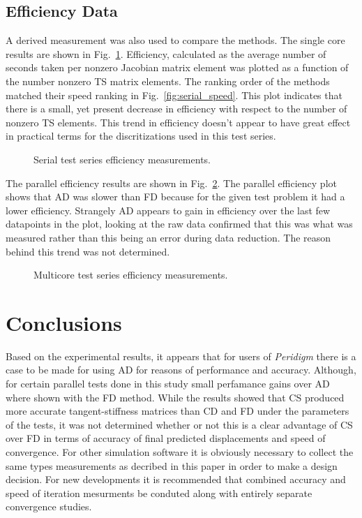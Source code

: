 \documentclass[preprint,12pt]{elsarticle}
\begin{document}
\subsection{Efficiency Data}
A derived measurement was also used to compare the methods. The single core results are shown in Fig.~\ref{fig:serial_efficiency}. Efficiency, calculated as the average number of seconds taken per nonzero Jacobian matrix element was plotted as a function of the number nonzero TS matrix elements. The ranking order of the methods
matched their speed ranking in Fig.~\ref{fig:serial_speed}. This plot indicates that there is a small, yet present decrease in efficiency with respect to the number of nonzero TS elements. This trend in efficiency doesn't appear to have great effect in practical terms for the discritizations used in this test series.  
%
\begin{figure}[tbp]
  \centering
  \scalebox{1.0}{}
  \caption{Serial test series efficiency measurements.}
  \label{fig:serial_efficiency}
\end{figure}
%
The parallel efficiency results are shown in Fig.~\ref{fig:multi_efficiency}. The parallel efficiency plot shows that AD was slower than FD because for the given test problem it had a lower efficiency. Strangely AD appears to gain in efficiency over the last few datapoints in the plot, looking at the raw data confirmed that this was what was measured rather than this being an error during data reduction. The reason behind this trend was not determined.
%
\begin{figure}[tbp]
  \centering
  \scalebox{1.0}{}
  \caption{Multicore test series efficiency measurements.}
  \label{fig:multi_efficiency}
\end{figure}


\section{Conclusions}
%
Based on the experimental results, it appears that for users of \emph{Peridigm} there is a case to be made for using AD for reasons of performance and accuracy. Although, for certain parallel tests done in this study small perfamance gains over AD where shown with the FD method.  While the results showed that CS produced more accurate tangent-stiffness matrices than CD and FD under the parameters of the tests, it was not determined whether or not this is a clear advantage of CS over FD in terms of accuracy of final predicted displacements and speed of convergence. For other simulation software it is obviously necessary to collect the same types measurements as decribed in this paper in order to make a design decision. For new developments it is recommended that combined accuracy and speed of iteration mesurments be conduted along with entirely separate convergence studies. 
\end{document}
